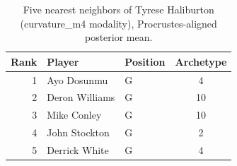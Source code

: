 \begin{table}[htbp]
  \centering\small
  \begin{tabular}{rllc}
    \toprule
    Rank & Player & Position & Archetype \\
    \midrule
    1 & Ayo Dosunmu & G & 4 \\
    2 & Deron Williams & G & 10 \\
    3 & Mike Conley & G & 10 \\
    4 & John Stockton & G & 2 \\
    5 & Derrick White & G & 4 \\
    \bottomrule
  \end{tabular}
  \caption{Five nearest neighbors of Tyrese Haliburton (curvature_m4 modality), Procrustes-aligned posterior mean.}
  \label{tab:Tyrese_Haliburton_neighbors_curvature_m4}
\end{table}

